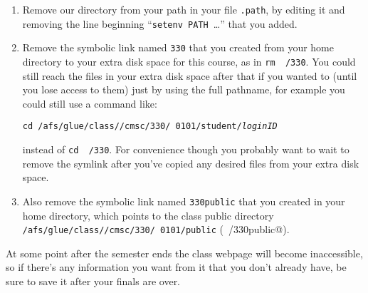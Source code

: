 \documentclass[11pt]{article}
\begin{document}
    \begin{enumerate}

      \addtolength{\itemsep}{-1mm}

      \item Remove our directory from your path in your file \texttt{.path},
            by editing it and removing the line beginning
            ``\texttt{setenv PATH }\ldots'' that you added.

      \item Remove the symbolic link named \texttt{330} that you created
            from your home directory to your extra disk space for this
            course, as in \texttt{rm \string~/330}.  You could still
            reach the files in your extra disk space after that if you
            wanted to (until you lose access to them) just by using the full
            pathname, for example you could still use a command like:

            \vspace{-4.5mm}

            \begin{center}

              \texttt{cd /afs/glue/class/\semester\number\year/cmsc/330/%
                      0101/student/\emph{\textrm{loginID}}}

            \end{center}

            \vspace{-3.5mm}

            instead of \texttt{cd \string~/330}.  For convenience though
            you probably want to wait to remove the symlink after you've
            copied any desired files from your extra disk space.

      \item Also remove the symbolic link named \texttt{330public} that you
            created in your home directory, which points to the class
            public directory
            \texttt{/afs/glue/class/\semester\number\year/cmsc/330/%
                    0101/public}
            (\verb@rm ~/330public@).

    \end{enumerate}

    \vspace{-1.5mm}

      At some point after the semester ends the class webpage will become
    inaccessible, so if there's any information you want from it that you
    don't already have, be sure to save it after your finals are over.
\end{document}
